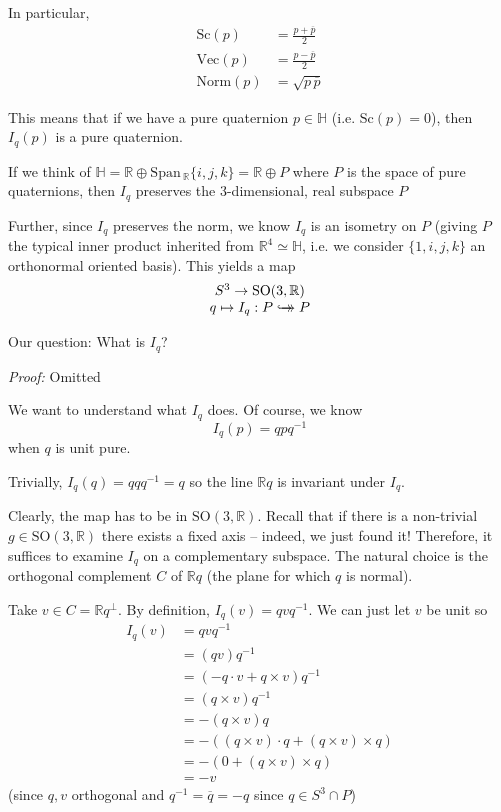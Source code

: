\documentclass[12pt]{article}
\newcommand{\R}{\mathbb{R}}
\renewcommand{\H}{\mathbb{H}}
\newcommand{\SO}{\text{SO}}
\newcommand{\biject}{\hookrightarrow \hspace{-8pt} \rightarrow}
\newcommand{\Span}{\text{Span}\,}
\newcommand{\Sc}{\text{Sc}}
\renewcommand{\bar}{\overline}
\newenvironment*{tbox}[2][gray]{
    \begin{tcolorbox}[
        parbox=false,
        colback=#1!5!white,
        colframe=#1!75!black,
        breakable,
        title={#2}
    ]}
    {\end{tcolorbox}}
\begin{document}
    In particular, 
    \begin{align*}
        \text{Sc}(p) &= \frac{p + \bar p}{2}\\ 
        \text{Vec}(p) &= \frac{p - \bar p}{2}\\ 
        \text{Norm}(p) &= \sqrt{p\, \bar p}
    \end{align*}

    This means that if we have a pure quaternion $p \in \H$ (i.e. $\Sc(p) = 0$), then $I_q(p)$ is a pure quaternion. 

    If we think of $\H = \R \oplus \Span_{\R}\{i, j, k\} = \R \oplus P$ where $P$ is the space of pure quaternions, then $I_q$ preserves the 3-dimensional, real subspace $P$

    Further, since $I_q$ preserves the norm, we know $I_q$ is an isometry on $P$ (giving $P$ the typical inner product inherited from $\R^4 \simeq \H$, i.e. we consider $\{1, i, j, k\}$ an orthonormal oriented basis). This yields a map 
    \[\begin{array}{c}
        S^3 \to \SO(3, \R)\\ 
        q \mapsto I_q: P \biject P
    \end{array}\] 

    Our question: What is $I_q$? 

    \begin{tbox}{\textbf{Lemma:} Let $q \in S^3$ be pure, $\Sc(q) = 0$, so $q \in P \cap S^3 \simeq S^2$ }
        \emph{Proof:} Omitted
    \end{tbox}

    We want to understand what $I_q$ does. Of course, we know 
    \[I_q(p) = qpq^{-1}\] 
    when $q$ is unit pure.

    Trivially, $I_q(q) = qqq^{-1} = q$ so the line $\R q$ is invariant under $I_q$. 

    Clearly, the map has to be in $\SO(3, \R)$. Recall that if there is a non-trivial $g \in \SO(3, \R)$ there exists a fixed axis -- indeed, we just found it! Therefore, it suffices to examine $I_q$ on a complementary subspace. The natural choice is the orthogonal complement $C$ of $\R q$ (the plane for which $q$ is normal). 
    
    Take $v \in C = \R q^{\perp}$. By definition, $I_q(v) = qvq^{-1}$. We can just let $v$ be unit so 
    \begin{align*}
        I_q(v) &= qvq^{-1}\\
        &= (qv)q^{-1}\\ 
        &= (-q\cdot v + q \times v)q^{-1}\\ 
        & = (q \times v)q^{-1}\\ 
        & = -(q \times v)q\\ 
        & = -((q \times v) \cdot q + (q \times v) \times q)\\ 
        &= -(0 + (q \times v) \times q)\\ 
        &= -v
    \end{align*}
    (since $q, v$ orthogonal and $q^{-1} = \bar q = -q$ since $q \in S^3 \cap P$)
\end{document}
